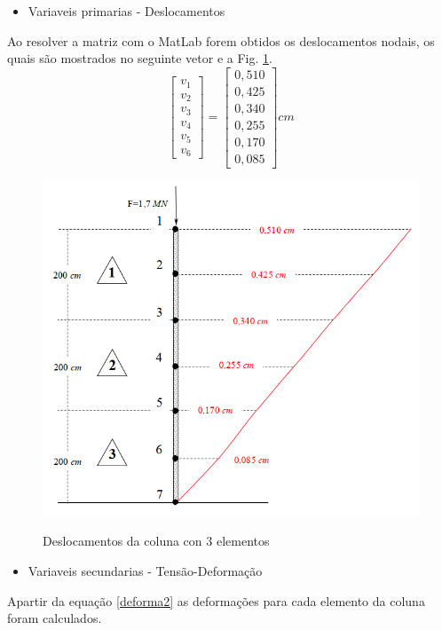 \documentclass{article} %
\begin{document}
\begin{itemize}
	\item Variaveis primarias - Deslocamentos
\end{itemize}

\indent Ao resolver a matriz com o MatLab forem obtidos os deslocamentos nodais, os quais são mostrados no seguinte vetor e a Fig. \ref{deslocamentos2}.
\begin{equation*}
\begin{bmatrix}
v_1\\
v_2\\
v_3\\
v_4\\
v_5\\
v_6
\end{bmatrix}=\begin{bmatrix}
0,510\\
0,425\\
0,340\\
0,255\\
0,170\\
0,085
\end{bmatrix}cm
\end{equation*}


\begin{figure}[H]
	\centering
	\caption{Deslocamentos da coluna con 3 elementos}
	\includegraphics[width=0.7\linewidth]{deslocamentos2}	
	\label{deslocamentos2}	
\end{figure}

\begin{itemize}
	\item Variaveis secundarias - Tensão-Deformação
\end{itemize}
\indent Apartir da equação \ref{deforma2} as deformações para cada elemento da coluna foram calculados.
\end{document}
